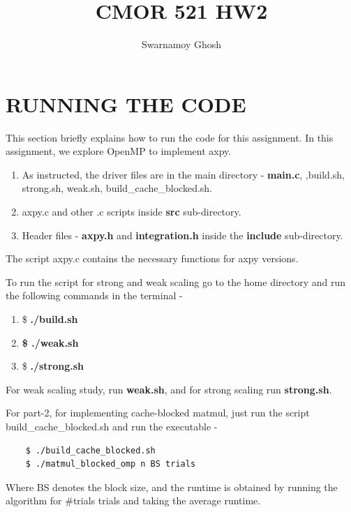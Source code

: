\documentclass{article}[12pt]
\title{CMOR 521 HW2}
\author{Swarnamoy Ghosh}
\date{}
\begin{document}
\maketitle

\section{RUNNING THE CODE}

This section briefly explains how to run the code for this assignment. In this assignment, we explore OpenMP to implement axpy.

\begin{enumerate}
    \item As instructed, the driver files are in the main directory - \textbf{main.c},   ,build.sh, strong.sh, weak.sh, build\_cache\_blocked.sh.
    \item axpy.c and other .c scripts inside \textbf{src} sub-directory.
    \item Header files - \textbf{axpy.h} and \textbf{integration.h} inside the \textbf{include} sub-directory.
\end{enumerate}

The script axpy.c contains the necessary functions for axpy versions.

\vspace{0.5cm}

To run the script for strong and weak scaling go to the home directory and run the following commands in the terminal -
\begin{enumerate}
    \item \$ \textbf{./build.sh}
    \item \textbf{\$ ./weak.sh}
    \item \$ \textbf{./strong.sh}
\end{enumerate}

For weak scaling study, run \textbf{weak.sh}, and for strong scaling run \textbf{strong.sh}.

For part-2, for implementing cache-blocked matmul, just run the script build\_cache\_blocked.sh and run the executable - 

\begin{verbatim}
    $ ./build_cache_blocked.sh
    $ ./matmul_blocked_omp n BS trials
\end{verbatim}

Where BS denotes the block size, and the runtime is obtained by running the algorithm for \#trials trials and taking the average runtime.
\end{document}
